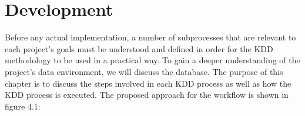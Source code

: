 %
%
%






\chapter{Development}

Before any actual implementation, a number of subprocesses that are relevant to each project's goals must be understood and defined in order for the KDD methodology to be used in a practical way. To gain a deeper understanding of the project's data environment, we will discuss the database. The purpose of this chapter is to discuss the steps involved in each KDD process as well as how the KDD process is executed. The proposed approach for the workflow is shown in figure 4.1:

	
	
	
